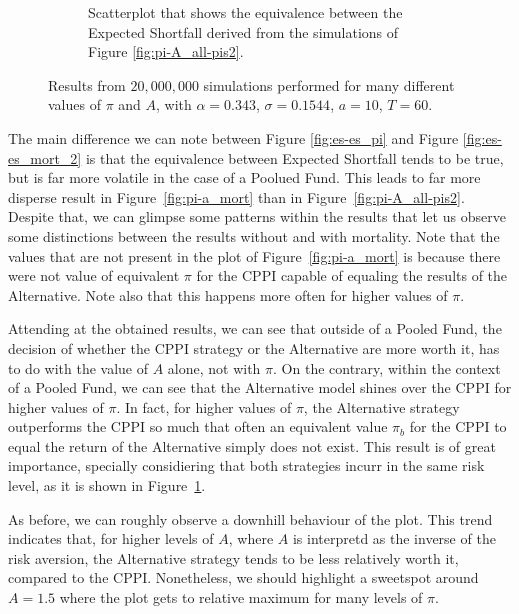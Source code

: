 \begin{figure}
\begin{subfigure}{.5\textwidth}
    \caption{Scatterplot that shows the equivalence between the Expected Shortfall derived from the simulations of Figure \ref{fig:pi-A_all-pis2}.}
    \label{fig:es-es_mort}
\end{subfigure}
\caption{Results from $20,000,000$ simulations performed for many different values of $\pi$ and $A$, with $\alpha = 0.343$, $\sigma = 0.1544$, $a = 10$, $T = 60$.}
\label{fig:compare_mort}
\end{figure}

The main difference we can note between Figure \ref{fig:es-es_pi} and Figure \ref{fig:es-es_mort_2} is that the equivalence between Expected Shortfall tends to be true, but is far more volatile in the case of a Poolued Fund. This leads to far more disperse result in Figure~\ref{fig:pi-a_mort} than in Figure~\ref{fig:pi-A_all-pis2}. Despite that, we can glimpse some patterns within the results that let us observe some distinctions between the results without and with mortality. Note that the values that are not present in the plot of Figure~\ref{fig:pi-a_mort} is because there were not value of equivalent $\pi$ for the CPPI capable of equaling the results of the Alternative. Note also that this happens more often for higher values of $\pi$.

Attending at the obtained results, we can see that outside of a Pooled Fund, the decision of whether the CPPI strategy or the Alternative are more worth it, has to do with the value of $A$ alone, not with $\pi$. On the contrary, within the context of a Pooled Fund, we can see that the Alternative model shines over the CPPI for higher values of $\pi$. In fact, for higher values of $\pi$, the Alternative strategy outperforms the CPPI so much that often an equivalent value $\pi_b$ for the CPPI to equal the return of the Alternative simply does not exist. This result is of great importance, specially considiering that both strategies incurr in the same risk level, as it is shown in Figure~\ref{fig:es-es_mort}.

As before, we can roughly observe a downhill behaviour of the plot.  This trend indicates that, for higher levels of $A$, where $A$ is interpretd as the inverse of the risk aversion, the Alternative strategy tends to be less relatively worth it, compared to the CPPI. Nonetheless, we should highlight a sweetspot around $A = 1.5$ where the plot gets to relative maximum for many levels of $\pi$.




